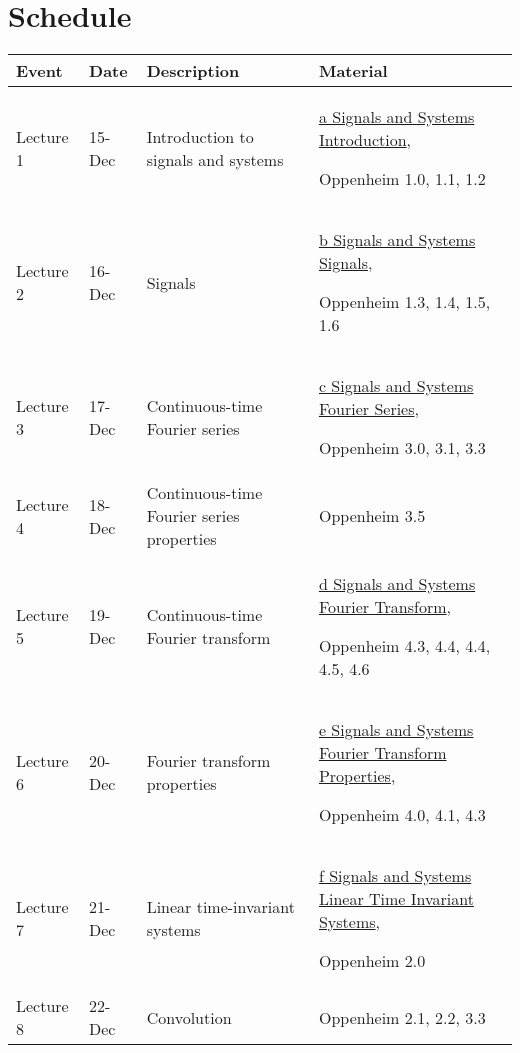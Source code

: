 \documentclass[11pt, a4paper]{article}
\begin{document}
\section{Schedule}


\begin{tabular}{@{}llp{2in}p{3in}@{}}
\toprule
Event 	&	Date 	&	Description	&						Material	\\
\midrule
Lecture 1	&	15-Dec	&	Introduction to signals and systems	&	\href{https://github.com/rangarodrigo/EN1060Lectures/blob/master/a\%20Signals\%20and\%20Systems\%20Introduction.pdf}{	a Signals and Systems Introduction}, \par	Oppenheim 1.0, 1.1, 1.2	\\
Lecture 2	&	16-Dec	&	Signals	&	\href{https://github.com/rangarodrigo/EN1060Lectures/blob/master/b\%20Signals\%20and\%20Systems\%20Signals.pdf}{	b Signals and Systems Signals}, \par	Oppenheim 1.3, 1.4, 1.5, 1.6	\\
Lecture 3	&	17-Dec	&	Continuous-time Fourier series	&	\href{https://github.com/rangarodrigo/EN1060Lectures/blob/master/c\%20Signals\%20and\%20Systems\%20Fourier\%20Series.pdf	}{c Signals and Systems Fourier Series}, \par	Oppenheim 3.0, 3.1, 3.3	\\
Lecture 4	&	18-Dec	&	Continuous-time Fourier series properties	&Oppenheim 3.5	\\
Lecture 5	&	19-Dec	&	Continuous-time Fourier transform	&	\href{https://github.com/rangarodrigo/EN1060Lectures/blob/master/d\%20Signals\%20and\%20Systems\%20Fourier\%20Transform.pdf	}{d Signals and Systems Fourier Transform}, \par	Oppenheim 4.3, 4.4, 4.4, 4.5, 4.6	\\
Lecture 6	&	20-Dec	&	Fourier transform properties	&	\href{https://github.com/rangarodrigo/EN1060Lectures/blob/master/e\%20Signals\%20and\%20Systems\%20Fourier\%20Transform\%20Properties.pdf	}{e Signals and Systems Fourier Transform Properties}, \par	Oppenheim 4.0, 4.1, 4.3	\\
Lecture 7	&	21-Dec	&	Linear time-invariant systems	&	\href{https://github.com/rangarodrigo/EN1060Lectures/blob/master/f\%20Signals\%20and\%20Systems\%20Linear\%20Time\%20Invariant\%20Systems.pdf	}{f Signals and Systems Linear Time Invariant Systems}, \par	Oppenheim 2.0	\\
Lecture 8	&	22-Dec	&	Convolution	&	 \par	Oppenheim 2.1, 2.2, 3.3	\\

\end{tabular}
\end{document}
